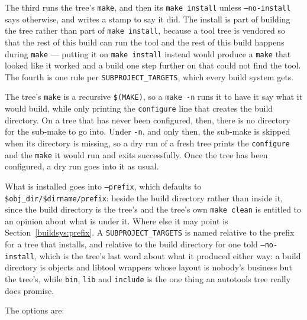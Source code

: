 \documentclass{article}
\begin{document}
The third runs the tree's \texttt{make}, and then its \texttt{make
install} unless \texttt{--no-install} says otherwise, and writes a
stamp to say it did.  The install is part of building the tree rather
than part of \texttt{make install}, because a tool tree is vendored so
that the rest of this build can run the tool and the rest of this
build happens during \texttt{make} --- putting it on \texttt{make
install} instead would produce a \texttt{make} that looked like it
worked and a build one step further on that could not find the tool.
The fourth is one rule per \texttt{SUBPROJECT\_TARGETS}, which every
build system gets.

The tree's \texttt{make} is a recursive \texttt{\$(MAKE)}, so a
\texttt{make -n} runs it to have it say what it would build, while
only printing the \texttt{configure} line that creates the build
directory.  On a tree that has never been configured, then, there
is no directory for the sub-make to go into.  Under \texttt{-n}, and
only then, the sub-make is skipped when its directory is missing, so
a dry run of a fresh tree prints the \texttt{configure} and the
\texttt{make} it would run and exits successfully.  Once the tree has
been configured, a dry run goes into it as usual.

What is installed goes into \texttt{--prefix}, which defaults to
\texttt{\$obj\_dir/\$dirname/prefix}: beside the build directory
rather than inside it, since the build directory is the tree's and the
tree's own \texttt{make clean} is entitled to an opinion about what is
under it.  Where else it may point is
Section~\ref{buildsys:prefix}.  A \texttt{SUBPROJECT\_TARGETS} is
named relative to the prefix for a tree that installs, and relative to
the build directory for one told \texttt{--no-install}, which is the
tree's last word about what it produced either way: a build directory
is objects and libtool wrappers whose layout is nobody's business but
the tree's, while \texttt{bin}, \texttt{lib} and \texttt{include} is
the one thing an autotools tree really does promise.

The options are:
\end{document}
